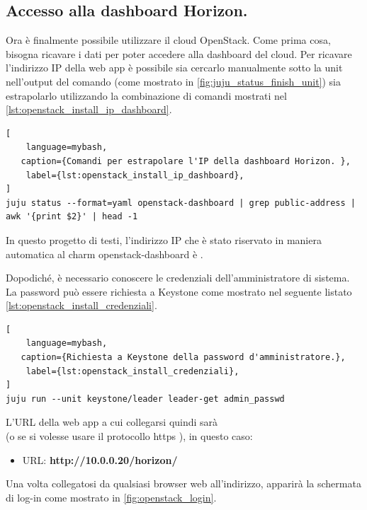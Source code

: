 \subsection{Accesso alla dashboard Horizon.}\label{subsec:openstack_dashboard}
Ora è finalmente possibile utilizzare il cloud OpenStack.
% 
Come prima cosa, bisogna ricavare i dati per poter accedere alla dashboard del cloud.
% 
Per ricavare l'indirizzo IP della web app è possibile sia cercarlo manualmente sotto la unit  nell'output del comando  (come mostrato in \cref{fig:juju_status_finish_unit}) sia estrapolarlo utilizzando la combinazione di comandi mostrati nel \cref{lst:openstack_install_ip_dashboard}.
\begin{lstlisting}[
    language=mybash, 
   caption={Comandi per estrapolare l'IP della dashboard Horizon. },
    label={lst:openstack_install_ip_dashboard},
]
juju status --format=yaml openstack-dashboard | grep public-address | awk '{print $2}' | head -1
\end{lstlisting}
In questo progetto di testi, l'indirizzo IP che è stato riservato in maniera automatica al charm openstack-dashboard è .
 
\vspace{1cm}\noindent
Dopodiché, è necessario conoscere le credenziali dell'amministratore di sistema.
% 
La password può essere richiesta a Keystone come mostrato nel seguente listato \cref{lst:openstack_install_credenziali}.
\begin{lstlisting}[
    language=mybash, 
   caption={Richiesta a Keystone della password d'amministratore.},
    label={lst:openstack_install_credenziali},
]
juju run --unit keystone/leader leader-get admin_passwd
\end{lstlisting}


\bigskip\noindent
L'URL della web app a cui collegarsi quindi sarà \\
(o se si volesse usare il protocollo https ), in questo caso:
% 
\begin{itemize}
    \item[]URL: \textbf{http://10.0.0.20/horizon/}
\end{itemize}
% 
Una volta collegatosi da qualsiasi browser web
all'indirizzo, apparirà la schermata di log-in come mostrato in \cref{fig:openstack_login}.

